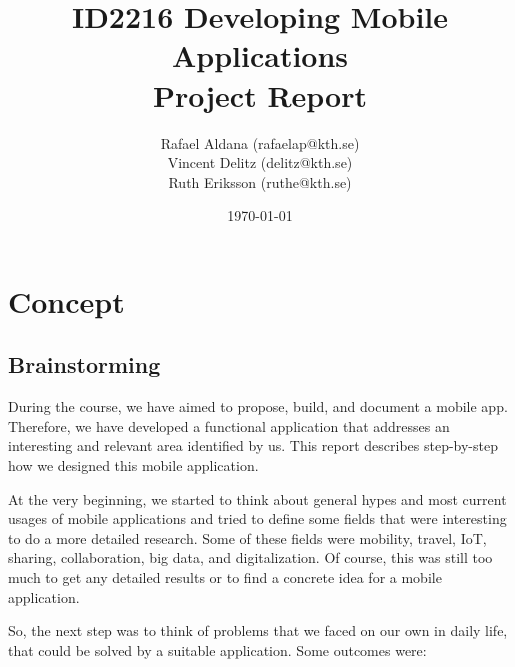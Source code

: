 \documentclass[11pt,twoside,a4paper]{report}
\begin{document}
\title{ID2216 Developing Mobile Applications\\Project Report}
\author{Rafael Aldana (rafaelap@kth.se)\\Vincent Delitz (delitz@kth.se)\\Ruth Eriksson (ruthe@kth.se)}
\date{\today}
\maketitle

\tableofcontents

\renewcommand{\chaptername}{Section}
\setcounter{chapter}{0}
\chapter{Concept}

\section{Brainstorming}

During the course, we have aimed to propose, build, and document a mobile app. Therefore, we have developed a functional application that addresses an interesting and relevant area identified by us. This report describes step-by-step how we designed this mobile application.

At the very beginning, we started to think about general hypes and most current usages of mobile applications and tried to define some fields that were interesting to do a more detailed research. Some of these fields were mobility, travel, IoT, sharing, collaboration, big data, and digitalization. Of course, this was still too much to get any detailed results or to find a concrete idea for a mobile application.

So, the next step was to think of problems that we faced on our own in daily life, that could be solved by a suitable application. Some outcomes were:
\end{document}
